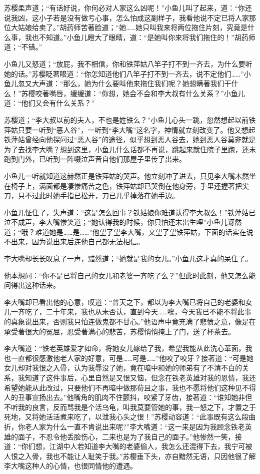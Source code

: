 \documentclass[12pt,oneside]{book}
\begin{document}
苏樱柔声道；``有话好说，你何必对人家这么凶呢！''小鱼儿叫了起来，道：``你还说我凶，这小子若是没有做亏心事，怎么怕成这副样子，我看他说不定已将人家那位大姑娘给卖了。''胡药师苦著脸道；``她\ldots\ldots 她只叫我来将两位拖住片刻，究竟是什么事，我也不知道。''小鱼儿瞪大了眼睛，道：``是她叫你来将我们拖住的！''胡药师道；``不错。''

小鱼儿又怒道；``放屁，我不相信，你和铁萍姑八竿子打不到一齐去，为什么要听她的话。''苏樱眨著眼道：``你怎知道他们八竿子打不到一齐去，说不定他们\ldots\ldots{}''小鱼儿忽又大声道：``那么，她为什么要叫他来拖住我们呢？她想瞒著我们干什么！''苏樱咬著嘴唇，缓缓道：``你想，她会不会和李大叔有什么关系？''小鱼儿道：``他们又会有什么关系？''

苏樱道；``李大叔以前的夫人，不也是姓铁么？''小鱼儿心头一跳，忽然想起以前铁萍姑只要一听到``恶人谷''，一听到``李大嘴''这名字，神情就立刻改变了。他又想起铁萍姑曾经向他探问过``恶人谷''的途径，似乎想到恶人谷去，她到恶人谷莫非就是为了去找李大嘴？想到这里，小鱼儿什么话都不再说，跳起来就住院子里跑，还末跑到门外，已听到一阵啜泣声音自他们那屋子里传了出来。

小鱼儿一听就知道这赫然正是铁萍姑的哭声。他立刻冲了进去，只见李大嘴木然坐在椅子上，满面都是凄惨痛苦之色，铁萍姑却已哭倒在他身旁，手里还握著把尖刀，只不过此时她手指已松开，刀已几乎掉落在她手边。

小鱼儿怔住了，失声道：``这是怎么回事？铁姑娘你难道认得李大叔么！''铁萍姑已泣不成声，李大嘴惨笑道；``她认得我的时候，你只怕还末出生哩''小鱼儿讶然道；``哦？难道她是\ldots\ldots 是\ldots\ldots{}''他望了望李大嘴，又望了望铁萍姑，下面的话实在说不出来，因为说出来后连他自己都无法相信。

李大嘴却长长叹息了一声，黯然道；``她就是我的女儿。''小鱼儿这才真的呆住了。

他本想问：``你不是已将自己的女儿和老婆一齐吃了么？''但此时此刻，他又怎么能问得出这种话来。

李大嘴却已看出他的心意，叹道：``普天之下，都以为李大嘴已将自己的老婆和女儿一齐吃了，二十年来，我也从未否认，直到今天\ldots\ldots 唉，今天我已不能不将此事的真象说出来，否则我只怕连做鬼都不甘心。''他语声中竟充满了悲愤之意，像是在承受著很大的冤屈，忍受著满心的悲苦，苏樱悄悄掩上了门，送了杯茶去。

李大嘴道：``铁老英雄爱才如命，将她女儿嫁给了我，希望我能从此洗心革面，我也一直都很感激他老人家的好意，可是\ldots\ldots 可是\ldots\ldots{}''他咬了咬牙？接著道：``可是她女儿却对我恨之入骨，认为我辱没了她，竟在暗中和她的师弟有了不清不白的关系，我知道了这件事后，心里自然是又恨又恼，但念在铁老英雄对我的恩情，我还希望她能从此改过，只要他们不再暗中做那荀且之事，我也不愿将他们这种见不得人的丑事宣扬出去。''他嘴角的肌肉不住颤抖，咬紧了牙齿，接著道：``谁知她非但不听我的良言，反而骂我是个活乌龟，叫我莫要管她的事，我一怒之下，才置之于死地，又将她活活煮来吃了，以泄我心头之恨！''苏樱动容道：``此事既有这么段曲折，你老人家为什么一直不肯说出来呢?''李大嘴道：``这一来是因为我顾念铁老英雄的面子，不忍令他丢脸伤心，二来也是为了我自己的面子。''他惨然一笑，接道：``你们想，江湖中人若知道李大嘴的老婆偷人，我怎么还混得下去，我宁可被人恨之入骨，我也不能让人耻笑于我。''苏樱垂下头，亦自黯然无语，只因他很了解李大嘴这种人的心情，也很同情他的遭遇。
\end{document}
